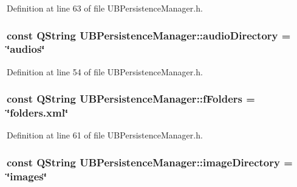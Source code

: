 Definition at line 63 of file U\-B\-Persistence\-Manager.\-h.

\hypertarget{class_u_b_persistence_manager_ad68b2f4bbd480f2119432f4b6f4b20d3}{
\subsubsection[{audio\-Directory}]{\setlength{\rightskip}{0pt plus 5cm}const Q\-String U\-B\-Persistence\-Manager\-::audio\-Directory = \char`\"{}audios\char`\"{}\hspace{0.3cm}{\ttfamily [static]}}}\label{d0/dd5/class_u_b_persistence_manager_ad68b2f4bbd480f2119432f4b6f4b20d3}


Definition at line 54 of file U\-B\-Persistence\-Manager.\-h.

\hypertarget{class_u_b_persistence_manager_ade8494f17a2732ac48f67f9a64b477c0}{
\subsubsection[{f\-Folders}]{\setlength{\rightskip}{0pt plus 5cm}const Q\-String U\-B\-Persistence\-Manager\-::f\-Folders = \char`\"{}folders.\-xml\char`\"{}\hspace{0.3cm}{\ttfamily [static]}}}\label{d0/dd5/class_u_b_persistence_manager_ade8494f17a2732ac48f67f9a64b477c0}


Definition at line 61 of file U\-B\-Persistence\-Manager.\-h.

\hypertarget{class_u_b_persistence_manager_afc92c7516c08081b8443076d1554e471}{
\subsubsection[{image\-Directory}]{\setlength{\rightskip}{0pt plus 5cm}const Q\-String U\-B\-Persistence\-Manager\-::image\-Directory = \char`\"{}images\char`\"{}\hspace{0.3cm}{\ttfamily [static]}}}\label{d0/dd5/class_u_b_persistence_manager_afc92c7516c08081b8443076d1554e471}


